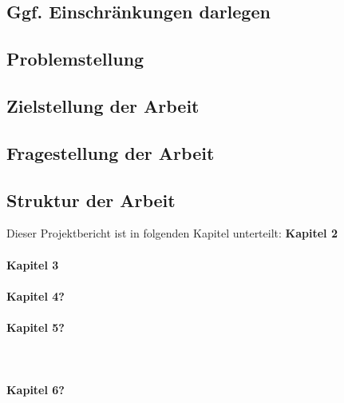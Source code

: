 \subsection{Ggf. Einschränkungen darlegen}
\subsection{Problemstellung}
\subsection{Zielstellung der Arbeit}
\subsection{Fragestellung der Arbeit}

\subsection{Struktur der Arbeit}
Dieser Projektbericht ist in folgenden Kapitel unterteilt:
\textbf{Kapitel 2}
\\\\
\textbf{Kapitel 3}
\\\\
\textbf{Kapitel 4?} 
\\\\
\textbf{Kapitel 5?} 
\\\\
\\\\
\textbf{Kapitel 6?} 
\\